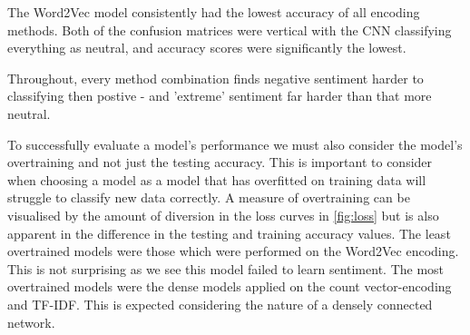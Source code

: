 \documentclass{article}
\begin{document}
The Word2Vec model consistently had the lowest accuracy of all encoding methods. Both of the confusion matrices were vertical with the CNN classifying everything as neutral, and accuracy scores were significantly the lowest.

Throughout, every method combination finds negative sentiment harder to classifying then postive - and 'extreme' sentiment far harder than that more neutral.

To successfully evaluate a model's performance we must also consider the model's overtraining and not just the testing accuracy. This is important to consider when choosing a model as a model that has overfitted on training data will struggle to classify new data correctly. A measure of overtraining can be visualised by the amount of diversion in the loss curves in \ref{fig:loss} but is also apparent in the difference in the testing and training accuracy values. The least overtrained models were those which were performed on the Word2Vec encoding. This is not surprising as we see this model failed to learn sentiment. The most overtrained models were the dense models applied on the count vector-encoding and TF-IDF. This is expected considering the nature of a densely connected network.



\end{document}
